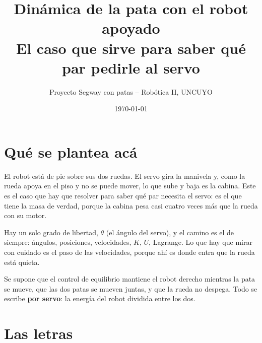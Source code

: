 \documentclass[11pt,a4paper]{article}
\title{Dinámica de la pata con el robot apoyado\\
\large El caso que sirve para saber qué par pedirle al servo}
\author{Proyecto Segway con patas -- Robótica II, UNCUYO}
\date{\today}
\begin{document}
\maketitle

\section{Qué se plantea acá}

El robot está de pie sobre sus dos ruedas. El servo gira la manivela y, como la rueda apoya en el piso y no
se puede mover, lo que sube y baja es la cabina. Este es el caso que hay que resolver para saber qué par
necesita el servo: es el que tiene la masa de verdad, porque la cabina pesa casi cuatro veces más que la rueda con su motor.

Hay un solo grado de libertad, \(\theta\) (el ángulo del servo), y el camino es el de siempre: ángulos,
posiciones, velocidades, \(K\), \(U\), Lagrange. Lo que hay que mirar con cuidado es el paso de las
velocidades, porque ahí es donde entra que la rueda está quieta.

Se supone que el control de equilibrio mantiene el robot derecho mientras la pata se mueve, que las dos patas
se mueven juntas, y que la rueda no despega. Todo se escribe \textbf{por servo}: la energía del robot dividida
entre los dos.

\section{Las letras}
\end{document}
